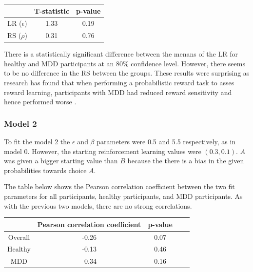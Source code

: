 \documentclass[12pt]{article}
\begin{document}
\begin{center}
 \begin{tabular}{|c || c | c |} 
 \hline
  & T-statistic & p-value  \\ [0.5ex] 
 \hline\hline
 LR ($\epsilon$) & 1.33 & 0.19 \\
 \hline
 RS ($\rho$) & 0.31 & 0.76 \\ [1ex] 
 \hline
\end{tabular}
\end{center}


There is a statistically significant difference between the menans of the LR for healthy and MDD participants at an 80\% confidence level. However, there seems to be no difference in the RS between the groups. These results were surprising as research has found that when performing a probabilistic reward task to asses reward learning, participants with MDD had reduced reward sensitivity and hence performed worse \cite{rho} .

\subsubsection{Model 2}

To fit the model 2 the $\epsilon$ and $\beta$ parameters were 0.5 and 5.5 respectively, as in model 0. However, the starting reinforcement learning values were $(0.3, 0.1)$. $A$ was given a bigger starting value than $B$ because the there is a bias in the given probabilities towards choice $A$. 

The table below shows the Pearson correlation coefficient between the two fit parameters for all participants, healthy participants, and MDD participants. As with the previous two models, there are no strong correlations.

\begin{center}
 \begin{tabular}{|c || c | c | c| c |} 
 \hline
  & Pearson correlation coefficient & p-value  \\ [0.5ex] 
 \hline\hline
 Overall & -0.26 & 0.07  \\ 
 \hline
 Healthy & -0.13 & 0.46 \\
 \hline
 MDD & -0.34 & 0.16 \\ [1ex] 
 \hline
\end{tabular}
\end{center}
\end{document}
